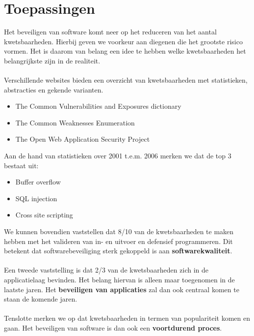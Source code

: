 \documentclass[../main.tex]{subfiles}
\begin{document}
\section{Toepassingen}
Het beveiligen van software komt neer op het reduceren van het aantal kwetsbaarheden. Hierbij geven we voorkeur aan diegenen die het grootste risico vormen. Het is daarom van belang een idee te hebben welke kwetsbaarheden het belangrijkste zijn in de realiteit. 
\\\\
Verschillende websites bieden een overzicht van kwetsbaarheden met statistieken, abstracties en gekende varianten.
\begin{itemize}
	\item The Common Vulnerabilities and Exposures dictionary
	\item The Common Weaknesses Enumeration
	\item The Open Web Application Security Project
\end{itemize}
\noindent
Aan de hand van statistieken over 2001 t.e.m. 2006 merken we dat de top 3 bestaat uit:
\begin{itemize}
	\item Buffer overflow
	\item SQL injection
	\item Cross site scripting
\end{itemize} 
We kunnen bovendien vaststellen dat 8/10 van de kwetsbaarheden te maken hebben met het valideren van in- en uitvoer en defensief programmeren. Dit betekent dat softwarebeveiliging sterk gekoppeld is aan \textbf{softwarekwaliteit}.
\\\\
Een tweede vaststelling is dat 2/3 van de kwetsbaarheden zich in de applicatielaag bevinden. Het belang hiervan is alleen maar toegenomen in de laatste jaren. Het \textbf{beveiligen van applicaties} zal dan ook centraal komen te staan de komende jaren.
\\\\
Tenslotte merken we op dat kwetsbaarheden in termen van populariteit komen en gaan. Het beveiligen van software is dan ook een \textbf{voortdurend proces}.
\end{document}
